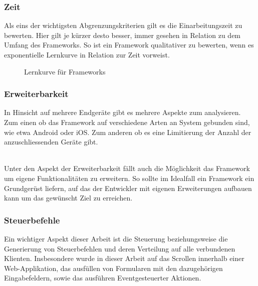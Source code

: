 	\subsubsection{Zeit}
	Als eins der wichtigsten Abgrenzungskriterien gilt es die Einarbeitungszeit zu bewerten. Hier gilt je kürzer desto besser, immer gesehen in Relation 	zu dem Umfang des Frameworks. So ist ein Framework qualitativer zu bewerten, wenn es exponentielle Lernkurve in Relation zur Zeit vorweist.

\begin{figure}[H]
	\centering
	\vspace{-25pt}
	\caption[Darstellung der Lernkurve für Frameworks]{Lernkurve für Frameworks}
\end{figure}
\vspace{-40pt}


	\pagebreak
	 \subsubsection{Erweiterbarkeit}
	 In Hinsicht auf mehrere Endgeräte gibt es mehrere Aspekte zum analysieren. Zum einen ob das Framework auf verschiedene 	Arten an System gebunden sind, wie etwa Android oder iOS. Zum anderen ob es eine Limitierung der Anzahl der 				anzuschliessenden Geräte gibt. 

	\\Unter den Aspekt der Erweiterbarkeit fällt auch die Möglichkeit das Framework um eigene Funktionalitäten zu erweitern. So 		sollte im Idealfall ein Framework ein Grundgerüst liefern, auf das der Entwickler mit eigenen Erweiterungen aufbauen kann um 	das gewünscht Ziel zu erreichen.
	
	\subsubsection{Steuerbefehle}
	Ein wichtiger Aspekt dieser Arbeit ist die Steuerung beziehungsweise die Generierung von Steuerbefehlen und deren Verteilung auf alle verbundenen Klienten. Insbesondere wurde in dieser Arbeit auf das Scrollen innerhalb einer Web-Applikation, das ausfüllen von Formularen mit den dazugehörigen Eingabefeldern, sowie das ausführen Eventgesteuerter Aktionen.

